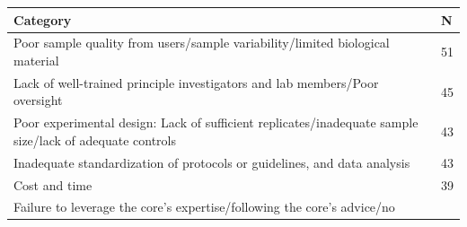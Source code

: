 \documentclass[]{article}
\begin{document}
\begin{longtable}[]{@{}ll@{}}
\toprule
\begin{minipage}[b]{0.05\columnwidth}\raggedright\strut
\textbf{Category}\strut
\end{minipage} & \begin{minipage}[b]{0.05\columnwidth}\raggedright\strut
\textbf{N}\strut
\end{minipage}\tabularnewline
\midrule
\endhead
\begin{minipage}[t]{0.05\columnwidth}\raggedright\strut
Poor sample quality from users/sample variability/limited biological
material\strut
\end{minipage} & \begin{minipage}[t]{0.05\columnwidth}\raggedright\strut
51\strut
\end{minipage}\tabularnewline
\begin{minipage}[t]{0.05\columnwidth}\raggedright\strut
Lack of well-trained principle investigators and lab members/Poor
oversight\strut
\end{minipage} & \begin{minipage}[t]{0.05\columnwidth}\raggedright\strut
45\strut
\end{minipage}\tabularnewline
\begin{minipage}[t]{0.05\columnwidth}\raggedright\strut
Poor experimental design: Lack of sufficient replicates/inadequate
sample size/lack of adequate controls\strut
\end{minipage} & \begin{minipage}[t]{0.05\columnwidth}\raggedright\strut
43\strut
\end{minipage}\tabularnewline
\begin{minipage}[t]{0.05\columnwidth}\raggedright\strut
Inadequate standardization of protocols or guidelines, and data
analysis\strut
\end{minipage} & \begin{minipage}[t]{0.05\columnwidth}\raggedright\strut
43\strut
\end{minipage}\tabularnewline
\begin{minipage}[t]{0.05\columnwidth}\raggedright\strut
Cost and time\strut
\end{minipage} & \begin{minipage}[t]{0.05\columnwidth}\raggedright\strut
39\strut
\end{minipage}\tabularnewline
\begin{minipage}[t]{0.05\columnwidth}\raggedright\strut
Failure to leverage the core's expertise/following the core's advice/no

\end{minipage}
\end{longtable}
\end{document}
